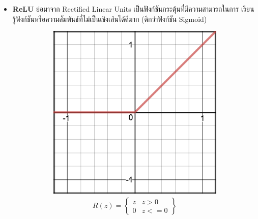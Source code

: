 \begin{itemize}
    \item \textbf{ReLU}\autocite{glorot2011} ย่อมาจาก Rectified Linear Units เป็นฟังก์ชันกระตุ้นที่มีความสามารถในการ%
    เรียนรู้ฟังก์ชันหรือความสัมพันธ์ที่ไม่เป็นเชิงเส้นได้ดีมาก (ดีกว่าฟังก์ชัน Sigmoid)
    \begin{figure}[H]
        \centering
        \begin{subfigure}{0.5\textwidth}
            \centering
            \includegraphics[width=0.9\linewidth]{fig/actfunc_relu.png}
            \caption{%
                \begin{equation}
                    \begin{split}R(z) = \begin{Bmatrix} z & z > 0 \\
                        0 & z <= 0 \end{Bmatrix}\end{split}
                \end{equation}
            }
            \label{fig:actfunc_relu}
        \end{subfigure}%
        \begin{subfigure}{0.5\textwidth}
            \centering

\end{subfigure}
\end{figure}
\end{itemize}
